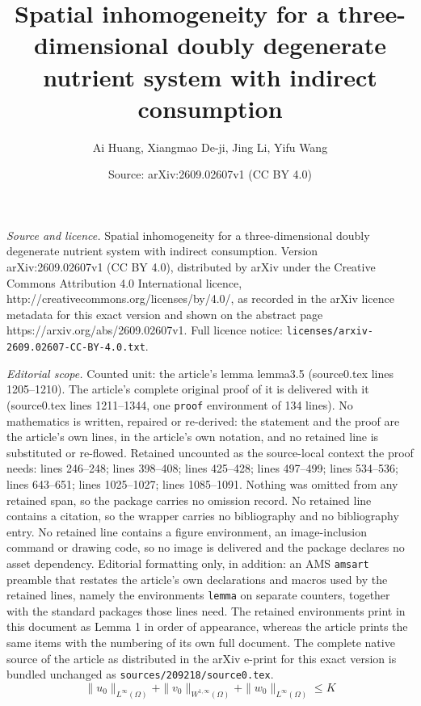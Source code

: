 \documentclass[10pt,a4paper]{amsart}
\title{Spatial inhomogeneity for a three-dimensional doubly degenerate nutrient system with indirect consumption}
\author{Ai Huang, Xiangmao De-ji, Jing Li, Yifu Wang}
\date{Source: arXiv:2609.02607v1 (CC BY 4.0)}
\begin{document}
\maketitle

\noindent\emph{Source and licence.} Spatial inhomogeneity for a three-dimensional doubly degenerate nutrient system with indirect consumption. Version arXiv:2609.02607v1 (CC BY 4.0), distributed by arXiv under the Creative Commons Attribution 4.0 International licence, http://creativecommons.org/licenses/by/4.0/, as recorded in the arXiv licence metadata for this exact version and shown on the abstract page https://arxiv.org/abs/2609.02607v1. Full licence notice: \texttt{licenses/arxiv-2609.02607-CC-BY-4.0.txt}.\par\smallskip

\noindent\textit{Editorial scope.} Counted unit: the article's lemma lemma3.5 (source0.tex lines 1205--1210). The article's complete original proof of it is delivered with it (source0.tex lines 1211--1344, one \texttt{proof} environment of 134 lines). No mathematics is written, repaired or re-derived: the statement and the proof are the article's own lines, in the article's own notation, and no retained line is substituted or re-flowed.  Retained uncounted as the source-local context the proof needs: lines 246--248; lines 398--408; lines 425--428; lines 497--499; lines 534--536; lines 643--651; lines 1025--1027; lines 1085--1091.  Nothing was omitted from any retained span, so the package carries no omission record.  No retained line contains a citation, so the wrapper carries no bibliography and no bibliography entry.  No retained line contains a figure environment, an image-inclusion command or drawing code, so no image is delivered and the package declares no asset dependency.  Editorial formatting only, in addition: an AMS \texttt{amsart} preamble that restates the article's own declarations and macros used by the retained lines, namely the environments \texttt{lemma} on separate counters, together with the standard packages those lines need.  The retained environments print in this document as Lemma 1 in order of appearance, whereas the article prints the same items with the numbering of its own full document.  The complete native source of the article as distributed in the arXiv e-print for this exact version is bundled unchanged as \texttt{sources/209218/source0.tex}.
\begin{equation}\label{1.6}
    \|u_0\|_{L^\infty(\Omega)}+\|v_0\|_{W^{1,\infty}(\Omega)}+\| w_0\|_{L^\infty(\Omega)}\leq K
\end{equation}
\end{document}
